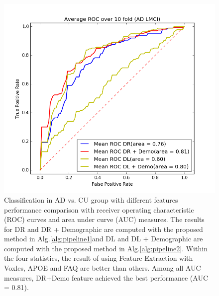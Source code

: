 \begin{figure}[h]
	\centering
	\includegraphics[width=\linewidth]{figures/AD_LMCI}
	\caption[ROC for AD vs. LMCI]{Classification in AD vs. CU group with different features performance comparison with receiver operating characteristic (ROC) curves and area under curve (AUC) measures. The results for DR and DR + Demographic are computed with the proposed method in Alg.\ref{alg:pipeline1}and DL and DL + Demographic are computed with the proposed method in Alg.\ref{alg:pipeline2}. Within the four statistics, the result of using Feature Extraction with Voxles, APOE and FAQ are better than others. Among all AUC measures, DR+Demo feature achieved the best performance (AUC = 0.81).}
	\label{fig:adlmci}
\end{figure}
